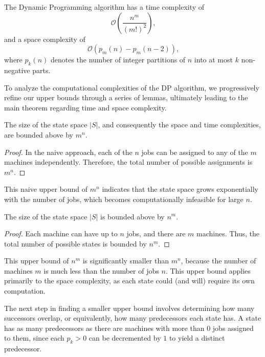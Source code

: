 \begin{theorem} \label{thm:dp-time-space-complexity}
    The Dynamic Programming algorithm has a time complexity of 
    \[
        \mathcal{O}\left( \frac{n^m}{(m!)^2} \right)\text{,}
    \]
    and a space complexity of 
    \[
        \mathcal{O}\left( p_m(n) - p_m(n-2) \right)\text{,}
    \]
    where $p_k(n)$ denotes the number of integer partitions of $n$ into at most $k$ non-negative parts.
\end{theorem}

To analyze the computational complexities of the DP algorithm, we progressively refine our upper bounds through a series of lemmas, ultimately leading to the main theorem regarding time and space complexity.

\begin{lemma}
    The size of the state space $|S|$, and consequently the space and time complexities, are bounded above by $m^n$.
\end{lemma}

\begin{proof}
    In the naive approach, each of the $n$ jobs can be assigned to any of the $m$ machines independently. Therefore, the total number of possible assignments is $m^n$.
\end{proof}

This naive upper bound of $m^n$ indicates that the state space grows exponentially with the number of jobs, which becomes computationally infeasible for large $n$.

\begin{lemma}
    The size of the state space $|S|$ is bounded above by $n^m$.
\end{lemma}

\begin{proof}
    Each machine can have up to $n$ jobs, and there are $m$ machines. Thus, the total number of possible states is bounded by $n^m$.
\end{proof}

This upper bound of $n^m$ is significantly smaller than $m^n$, because the number of machines $m$ is much less than the number of jobs $n$. This upper bound applies primarily to the space complexity, as each state could (and will) require its own computation.

The next step in finding a smaller upper bound involves determining how many successors overlap, or equivalently, how many predecessors each state has. A state has as many predecessors as there are machines with more than $0$ jobs assigned to them, since each $p_k > 0$ can be decremented by $1$ to yield a distinct predecessor.


